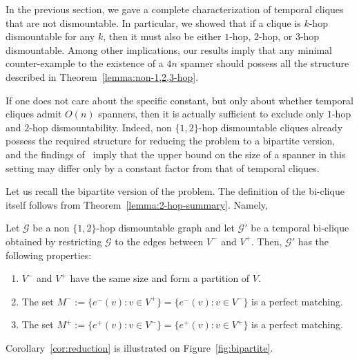 \documentclass[USenglish, a4paper, thm-restate,numberwithinsect, cleveref]{lipics-v2021}
\newcommand{\G}{\ensuremath{\mathcal{G}}\xspace}
\begin{document}
In the previous section, we gave a complete characterization of temporal cliques that are not dismountable. In particular, we showed that if a clique is $k$-hop dismountable for any $k$, then it must also be either $1$-hop, $2$-hop, or $3$-hop dismountable. Among other implications, our results imply that any minimal counter-example to the existence of a $4n$ spanner should possess all the structure described in Theorem~\ref{lemma:non-1,2,3-hop}.

If one does not care about the specific constant, but only about whether temporal cliques admit $O(n)$ spanners, then it is actually sufficient to exclude only $1$-hop and $2$-hop dismountability. Indeed, non $\{1,2\}$-hop dismountable cliques already possess the required structure for reducing the problem to a bipartite version, and the findings of~\cite{Hasso} imply that the upper bound on the size of a spanner in this setting may differ only by a constant factor from that of temporal cliques. %

Let us recall the bipartite version of the problem. The definition of the bi-clique itself follows from Theorem~\ref{lemma:2-hop-summary}. Namely,

\begin{corollary}
  \label{cor:reduction}
  Let $\G$ be a non $\{1,2\}$-hop dismountable graph and let $\G'$ be a temporal bi-clique obtained by restricting $\G$ to the edges between $V^-$ and $V^+$. Then, $\G'$ has the following properties:
  \begin{enumerate}
  \item $V^-$ and $V^+$ have the same size and form a partition of $V$.
  \item The set $M^-:=\{e^-(v) : v\in V^+\}=\{e^-(v) : v\in V^-\}$ is a perfect matching.
  \item The set $M^+:=\{e^+(v) : v\in V^-\}=\{e^+(v) : v\in V^+\}$ is a perfect matching.
  \end{enumerate}
\end{corollary}

Corollary~\ref{cor:reduction} is illustrated on Figure~\ref{fig:bipartite}.
\end{document}
